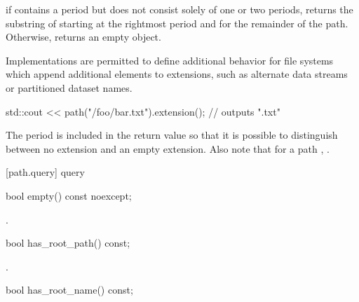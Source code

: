 \begin{itemdescr}
\pnum
\returns if  contains a period but does not
  consist solely of one or two periods, returns
  the substring of  starting at the rightmost period
  and for the remainder of the path. Otherwise, returns an empty  object.

\pnum
\remarks Implementations are permitted to define additional
  behavior for file systems which append additional elements to extensions, such
  as alternate data streams or partitioned dataset names.

\pnum
\begin{example}
\begin{codeblock}
std::cout << path("/foo/bar.txt").extension(); // outputs ".txt"
\end{codeblock}
\end{example}

\pnum
\begin{note} The period is included in the return value so that it is
  possible to distinguish between no extension and an empty extension. Also note
  that for a path , .
  \end{note}
\end{itemdescr}

[path.query]{ query}

\begin{itemdecl}
bool empty() const noexcept;
\end{itemdecl}

\begin{itemdescr}
\pnum
\returns {}.
\end{itemdescr}

\begin{itemdecl}
bool has_root_path() const;
\end{itemdecl}

\begin{itemdescr}
\pnum
\returns {}.
\end{itemdescr}

\begin{itemdecl}
bool has_root_name() const;
\end{itemdecl}

